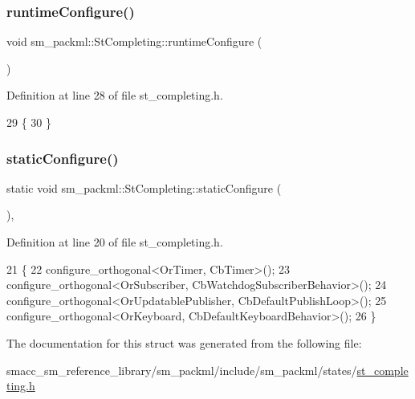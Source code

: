 \subsubsection{\texorpdfstring{runtime\+Configure()}{runtimeConfigure()}}
{\footnotesize\ttfamily void sm\+\_\+packml\+::\+St\+Completing\+::runtime\+Configure (\begin{DoxyParamCaption}{ }\end{DoxyParamCaption})\hspace{0.3cm}{\ttfamily [inline]}}



Definition at line 28 of file st\+\_\+completing.\+h.


\begin{DoxyCode}
29     \{
30     \}
\end{DoxyCode}
\mbox{\label{structsm__packml_1_1StCompleting_a35bb0cd98f224670c9595b7149fc76f1}} 
\subsubsection{\texorpdfstring{static\+Configure()}{staticConfigure()}}
{\footnotesize\ttfamily static void sm\+\_\+packml\+::\+St\+Completing\+::static\+Configure (\begin{DoxyParamCaption}{ }\end{DoxyParamCaption})\hspace{0.3cm}{\ttfamily [inline]}, {\ttfamily [static]}}



Definition at line 20 of file st\+\_\+completing.\+h.


\begin{DoxyCode}
21     \{
22         configure\_orthogonal<OrTimer, CbTimer>();   
23         configure\_orthogonal<OrSubscriber, CbWatchdogSubscriberBehavior>();
24         configure\_orthogonal<OrUpdatablePublisher, CbDefaultPublishLoop>();
25         configure\_orthogonal<OrKeyboard, CbDefaultKeyboardBehavior>();
26     \}
\end{DoxyCode}


The documentation for this struct was generated from the following file\+:\begin{DoxyCompactItemize}
\item 
smacc\+\_\+sm\+\_\+reference\+\_\+library/sm\+\_\+packml/include/sm\+\_\+packml/states/\hyperlink{st__completing_8h}{st\+\_\+completing.\+h}\end{DoxyCompactItemize}
